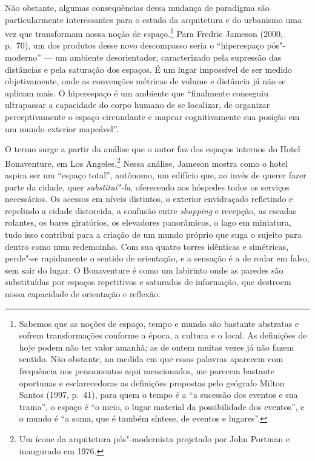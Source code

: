Não obstante, algumas consequências dessa mudança de paradigma são
particularmente interessantes para o estudo da arquitetura e do
urbanismo uma vez que transformam nossa noção de espaço.\footnote{Sabemos
  que as noções de espaço, tempo e mundo são bastante abstratas e sofrem
  transformações conforme a época, a cultura e o local. As definições de
  hoje podem não ter valor amanhã; as de ontem muitas vezes já não fazem
  sentido. Não obstante, na medida em que essas palavras aparecem com
  frequência nos pensamentos aqui mencionados, me parecem bastante
  oportunas e esclarecedoras as definições propostas pelo geógrafo
  Milton Santos (1997, p.~41), para quem o tempo é a ``a sucessão dos
  eventos e sua trama'', o espaço é ``o meio, o lugar material da
  possibilidade dos eventos'', e o mundo é ``a soma, que é também
  síntese, de eventos e lugares''.} Para Fredric Jameson (2000, p.~70), um dos
produtos desse novo descompasso seria o ``hiperespaço pós"-moderno'' ---
um ambiente desorientador, caracterizado pela supressão das distâncias e
pela saturação dos espaços. É um lugar impossível de ser medido
objetivamente, onde as convenções métricas de volume e distância já não
se aplicam mais. O hiperespaço é um ambiente que ``finalmente conseguiu
ultrapassar a capacidade do corpo humano de se localizar, de organizar
perceptivamente o espaço circundante e mapear cognitivamente sua posição
em um mundo exterior mapeável''.

O termo surge a partir da análise que o autor faz dos espaços internos
do Hotel Bonaventure, em Los Angeles.\footnote{Um ícone da arquitetura
  pós"-modernista projetado por John Portman e inaugurado em 1976.} Nessa
análise, Jameson mostra como o hotel aspira ser um ``espaço total'',
autônomo, um edifício que, ao invés de querer fazer parte da cidade, quer \emph{substituí"-la}, oferecendo aos hóspedes todos os serviços necessários. Os acessos em níveis distintos, o
exterior envidraçado refletindo e repelindo a cidade distorcida, a \label{hotel}
confusão entre \emph{shopping} e recepção, as escadas rolantes, os bares
giratórios, os elevadores panorâmicos, o lago em miniatura, tudo isso
contribui para a criação de um mundo próprio que suga o sujeito
para dentro como num redemoinho. Com sua quatro torres idênticas e simétricas, perde"-se rapidamente o sentido de orientação, e a sensação é a de rodar em falso, sem sair do lugar. O Bonaventure é como um labirinto onde as paredes são substituídas por espaços repetitivos e saturados de informação, que destroem nossa capacidade de orientação e reflexão.

